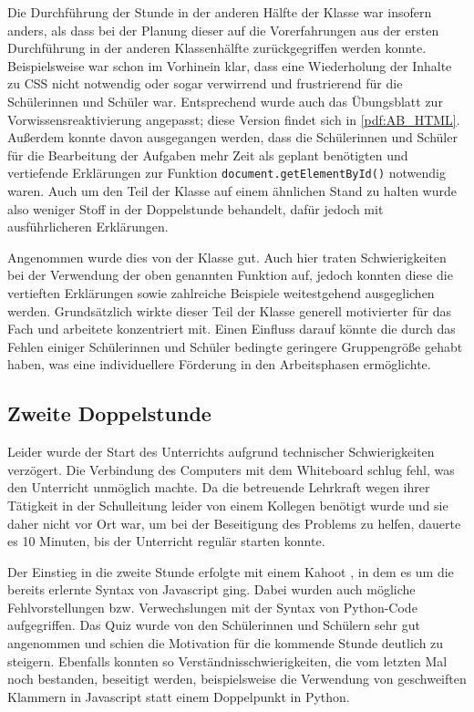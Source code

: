Die Durchführung der Stunde in der anderen Hälfte der Klasse war insofern anders, als dass bei der Planung dieser auf die Vorerfahrungen aus der ersten Durchführung in der anderen Klassenhälfte zurückgegriffen werden konnte.
Beispielsweise war schon im Vorhinein klar, dass eine Wiederholung der Inhalte zu CSS nicht notwendig oder sogar verwirrend und frustrierend für die Schülerinnen und Schüler war.
Entsprechend wurde auch das Übungsblatt zur Vorwissensreaktivierung angepasst; diese Version findet sich in \autoref{pdf:AB_HTML}.
Außerdem konnte davon ausgegangen werden, dass die Schülerinnen und Schüler für die Bearbeitung der Aufgaben mehr Zeit als geplant benötigten und vertiefende Erklärungen zur Funktion \texttt{document.getElementById()} notwendig waren.
Auch um den Teil der Klasse auf einem ähnlichen Stand zu halten wurde also weniger Stoff in der Doppelstunde behandelt, dafür jedoch mit ausführlicheren Erklärungen.

Angenommen wurde dies von der Klasse gut.
Auch hier traten Schwierigkeiten bei der Verwendung der oben genannten Funktion auf, jedoch konnten diese die vertieften Erklärungen sowie zahlreiche Beispiele weitestgehend ausgeglichen werden.
Grundsätzlich wirkte dieser Teil der Klasse generell motivierter für das Fach und arbeitete konzentriert mit.
Einen Einfluss darauf könnte die durch das Fehlen einiger Schülerinnen und Schüler bedingte geringere Gruppengröße gehabt haben, was eine individuellere Förderung in den Arbeitsphasen ermöglichte.


\subsection{Zweite Doppelstunde}
\label{subsec:doppelstunde-2}

Leider wurde der Start des Unterrichts aufgrund technischer Schwierigkeiten verzögert.
Die Verbindung des Computers mit dem Whiteboard schlug fehl, was den Unterricht unmöglich machte.
Da die betreuende Lehrkraft wegen ihrer Tätigkeit in der Schulleitung leider von einem Kollegen benötigt wurde und sie daher nicht vor Ort war, um bei der Beseitigung des Problems zu helfen, dauerte es 10 Minuten, bis der Unterricht regulär starten konnte.

Der Einstieg in die zweite Stunde erfolgte mit einem Kahoot \cite{wang2020kahoot, dellos2015kahoot}, in dem es um die bereits erlernte Syntax von Javascript ging.
Dabei wurden auch mögliche Fehlvorstellungen bzw. Verwechslungen mit der Syntax von Python-Code aufgegriffen.
Das Quiz wurde von den Schülerinnen und Schülern sehr gut angenommen und schien die Motivation für die kommende Stunde deutlich zu steigern.
Ebenfalls konnten so Verständnisschwierigkeiten, die vom letzten Mal noch bestanden, beseitigt werden, beispielsweise die Verwendung von geschweiften Klammern in Javascript statt einem Doppelpunkt in Python.

